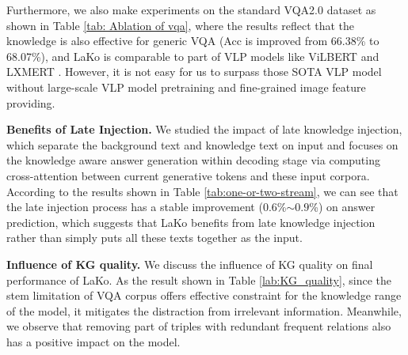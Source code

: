 \documentclass[sigconf]{acmart}
\newcommand{\cjy}[1]{{\color{black}#1}}
\begin{document}
Furthermore, we also make experiments on the standard \cjy{VQA}2.0 dataset as shown in Table \ref{tab: Ablation of vqa}, where the results reflect that the knowledge is also effective for generic VQA (\cjy{Acc is improved} from 66.38\% to 68.07\%), and LaKo is comparable to part of VLP models like ViLBERT \citep{DBLP:conf/nips/LuBPL19} and LXMERT \citep{DBLP:conf/emnlp/TanB19}. 
However, it is not easy for us to surpass those SOTA VLP model without large-scale VLP model pretraining and fine-grained image feature providing. 

\noindent\textbf{Beneﬁts of Late Injection.} 
We studied the impact of late knowledge injection, 
which separate the background text and knowledge text on input and focuses on the knowledge aware answer generation within decoding stage via  computing cross-attention between  current generative tokens and these input corpora. 
\cjy{According to} the results shown in Table \ref{tab:one-or-two-stream}, we can see that the late injection process has a stable improvement ($0.6$\%$\sim0.9$\%) on answer prediction, which suggests that LaKo 
\cjy{benefits} from late knowledge injection rather than simply put\cjy{s} all these texts together as the input. 

\noindent\textbf{Influence of KG quality.}
We discuss the influence of KG quality on final performance of LaKo.
As the result shown in Table \ref{lab:KG_quality}, since the stem limitation of VQA corpus offers effective constraint for the knowledge range of the model, it mitigates the distraction from irrelevant information.
Meanwhile, we observe that removing part of triples with redundant frequent relations also has a positive impact on the model.
\begin{table}[htbp]
    \centering
    \caption{``Stem Filter'': filtering out triples whose heads or tails do not contain stems in VQA corpus.
    ``Freq. Rm'': selectively removing those triples which contain frequent relations (see Sec. \ref{sec:KGc} for details).}
    \vspace{-1mm}

    \label{lab:KG_quality}
    \vspace{-1mm}
\end{table}
\end{document}
